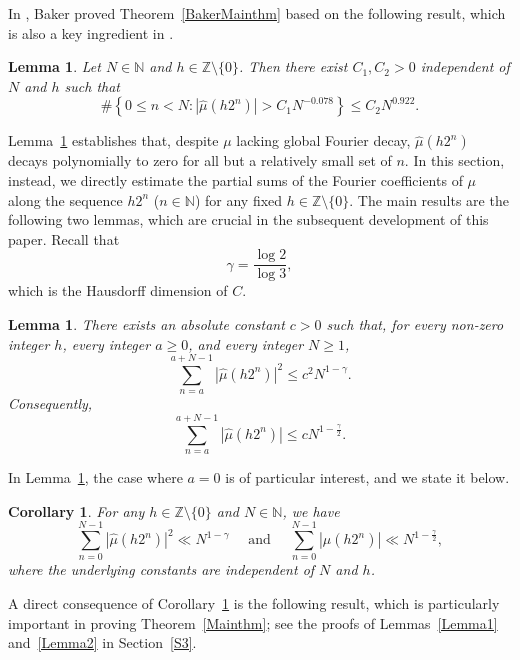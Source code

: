 \documentclass[amssymb,amsfonts,refcheck,12pt,verbatim,righttag]{amsart}
\numberwithin{equation}{section} %
\newtheorem{lem}[thm]{Lemma}
\newtheorem{cor}[thm]{Corollary}
\newcommand{\N}{\mathbb{N}}
\newcommand{\Z}{\mathbb{Z}}
\theoremstyle{plain}
\begin{document}
In \cite{Baker25A}, Baker proved  Theorem~\ref{BakerMainthm} based on the following result, which is also a key ingredient in \cite{ABCY23A}. 
\begin{lem}\cite[Lemma 2.2]{Baker25A}\label{Bakerlemma}
	Let $N\in\mathbb{N}$ and $h\in\mathbb{Z}\setminus \{0\}$. Then there exist $C_{1},C_{2}>0$ independent of $N$ and $h$ such that 
	$$\# \left\{0\leq n<N:\left|\widehat{\mu}(h 2^n)\right|> C_{1}N^{-0.078}\right\}\leq C_{2}N^{0.922}.$$
\end{lem}
Lemma~\ref{Bakerlemma} establishes  that,  despite  $\mu$ lacking global Fourier decay, $\widehat{\mu}(h 2^n)$ decays polynomially to zero for all but a  relatively small set of $n$. In this section, instead,  we directly estimate the partial sums of the Fourier coefficients of $\mu$ along the sequence $h2^n$ ($n\in\N$) for any fixed $h\in\Z\setminus\{0\}$. 
The main results are the following two lemmas, which are crucial in the subsequent  development of this paper. Recall that
\[\gamma=\frac{\log2}{\log3},\]
which is the Hausdorff dimension of $C$. 
\begin{lem}\label{LemL2-dyadic}
	There exists an absolute constant $c>0$ such that, for every non-zero integer $h$, every integer $a\ge 0$, and every integer $N\ge 1$,
\begin{equation}\label{eq:L2-main}
		\sum_{n=a}^{a+N-1}|\widehat\mu(h2^n)|^2
		\leq c^2 N^{1-\gamma}.
	\end{equation}
	Consequently, 
\begin{equation}\label{eq:L1-main}
		\sum_{n=a}^{a+N-1}|\widehat\mu(h2^n)|
		\leq c N^{1-\frac{\gamma}{2}}.
	\end{equation}
\end{lem}
In Lemma~\ref{LemL2-dyadic},
the case where $a=0$ is of particular interest, and we state it below.
\begin{cor}\label{cor:prefix}
	For any $h\in\Z\setminus\{0\}$ and  $N\in \N$, we have 
	\begin{equation*}\label{eqsumestimate}
		\sum_{n=0}^{N-1}|\widehat\mu(h2^n)|^2
		\ll N^{1-\gamma} \quad \text{ and }\quad 
		\sum_{n=0}^{N-1}|\widehat\mu(h2^n)|
		\ll N^{1-\frac{\gamma}{2}},
	\end{equation*}
	where the underlying constants are independent of $N$ and  $h$. 
\end{cor}

A direct consequence of Corollary~\ref{cor:prefix} is the following result, which is particularly important in proving Theorem~\ref{Mainthm}; see the proofs of Lemmas~\ref{Lemma1} and~\ref{Lemma2} in Section~\ref{S3}.
\end{document}
